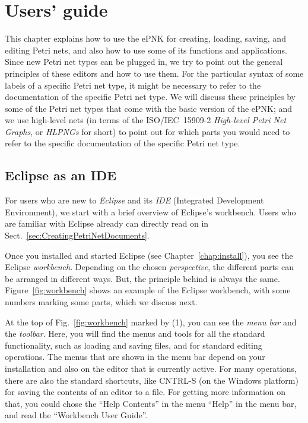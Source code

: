 \chapter{Users' guide}
\label{chap:users-guide}

This chapter explains how to use the ePNK for creating, loading, saving, and
editing Petri nets, and also how to use some of its functions and applications.
Since new Petri net types can be plugged in, we try to point out the general
principles of these editors and how to use them. For the particular syntax of
some labels of a specific Petri net type, it might be necessary to refer to
the documentation of the specific Petri net type. We will discuss
these principles by some of the Petri net types that come with the basic version of
the ePNK; and we use high-level nets (in terms of the ISO/IEC~15909-2
\emph{High-level Petri Net Graphs}, or \emph{HLPNGs}%
for short) to point out for which parts you would need to refer to the specific
documentation of the specific Petri net type.

\section{Eclipse as an IDE}
\label{sec:Eclipse-IDE}
For users who are new to \emph{Eclipse} and its \emph{IDE} (Integrated
Development Environment), we start with a brief overview of Eclipse's workbench.
Users who are familiar with Eclipse already can directly read on in
Sect.~\ref{sec:CreatingPetriNetDocuments}.

Once you installed and started Eclipse (see Chapter~\ref{chap:install}), you
see the Eclipse \emph{workbench}.%
Depending on the chosen \emph{perspective},%
the different parts can be arranged in different ways. But,
the principle behind is always the same. Figure~\ref{fig:workbench} shows an
example of the Eclipse workbench, with some numbers marking some parts, which
we discuss next.

At the top of Fig.~\ref{fig:workbench} marked by (1), you can see the
\emph{menu bar} and the \emph{toolbar}.%
Here, you will find the menus and tools for all the standard functionality, such
as loading and saving files, and for standard editing operations. The
menus that are shown in the menu bar depend on your installation and
also on the editor that is currently active. For many operations,
there are also the standard shortcuts, like CNTRL-S (on the
Windows platform) for saving the contents of an editor to a file.  For getting
more information on that, you could chose the ``Help Contents'' in the menu
``Help'' in the menu bar, and read the ``Workbench User Guide''.

